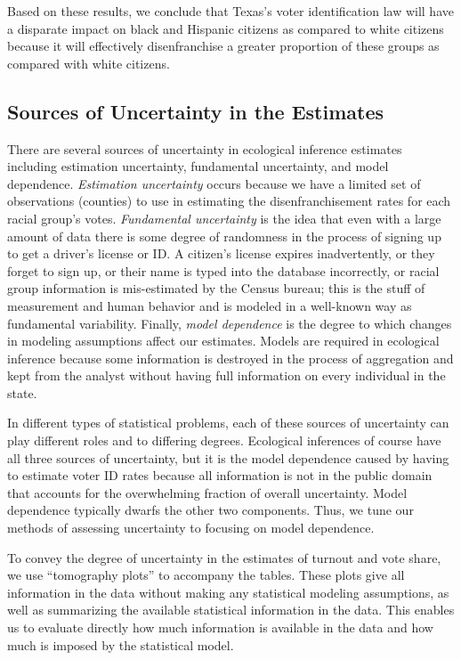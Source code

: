 \documentclass[12pt]{article}
\begin{document}
Based on these results, we conclude that Texas's voter identification law will have a disparate impact on black and Hispanic citizens as compared to white citizens because it will effectively disenfranchise a greater proportion of these groups as compared with white citizens.

\subsection{Sources of Uncertainty in the Estimates}

There are several sources of uncertainty in ecological inference
estimates including estimation uncertainty, fundamental uncertainty,
and model dependence.  \emph{Estimation uncertainty} occurs because we
have a limited set of observations (counties) to use in
estimating the disenfranchisement rates for each racial group's votes.
\emph{Fundamental uncertainty} is the idea that even with a large
amount of data there is some degree of randomness in the process of
signing up to get a driver's license or ID.  A citizen's license
expires inadvertently, or they forget to sign up, or their name is
typed into the database incorrectly, or racial group information is
mis-estimated by the Census bureau; this is the stuff of measurement
and human behavior and is modeled in a well-known way as fundamental
variability. Finally, \emph{model dependence} is the degree to which
changes in modeling assumptions affect our estimates.  Models are
required in ecological inference because some information is destroyed
in the process of aggregation and kept from the analyst without having
full information on every individual in the state.

In different types of statistical problems, each of these sources of
uncertainty can play different roles and to differing degrees.
Ecological inferences of course have all three sources of uncertainty,
but it is the model dependence caused by having to estimate voter ID
rates because all information is not in the public domain that
accounts for the overwhelming fraction of overall uncertainty.  Model
dependence typically dwarfs the other two components. Thus, we tune
our methods of assessing uncertainty to focusing on model dependence.

To convey the degree of uncertainty in the estimates of turnout and
vote share, we use ``tomography plots'' to accompany the tables.
These plots give all information in the data without making any
statistical modeling assumptions, as well as summarizing the available
statistical information in the data. This enables us to evaluate
directly how much information is available in the data and how much
is imposed by the statistical model.
\end{document}
